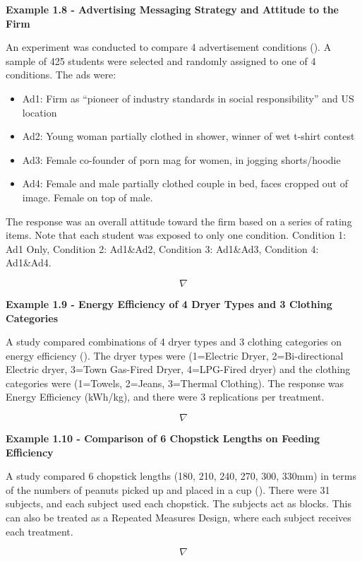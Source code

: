 \documentclass[
]{book}
\providecommand{\tightlist}{%
  \setlength{\itemsep}{0pt}\setlength{\parskip}{0pt}}
\begin{document}
\textbf{Example 1.8 - Advertising Messaging Strategy and Attitude to the
Firm}

An experiment was conducted to compare 4 advertisement conditions
(). A sample
of 425 students were selected and randomly assigned to one of 4
conditions. The ads were:

\begin{itemize}
\tightlist
\item
  Ad1: Firm as ``pioneer of industry standards in social
  responsibility'' and US location
\item
  Ad2: Young woman partially clothed in shower, winner of wet t-shirt
  contest
\item
  Ad3: Female co-founder of porn mag for women, in jogging shorts/hoodie
\item
  Ad4: Female and male partially clothed couple in bed, faces cropped
  out of image. Female on top of male.
\end{itemize}

The response was an overall attitude toward the firm based on a series
of rating items. Note that each student was exposed to only one
condition. Condition 1: Ad1 Only, Condition 2: Ad1\&Ad2, Condition 3:
Ad1\&Ad3, Condition 4: Ad1\&Ad4.

\[\nabla\]

\textbf{Example 1.9 - Energy Efficiency of 4 Dryer Types and 3 Clothing
Categories}

A study compared combinations of 4 dryer types and 3 clothing categories
on energy efficiency (). The dryer
types were (1=Electric Dryer, 2=Bi-directional Electric dryer, 3=Town
Gas-Fired Dryer, 4=LPG-Fired dryer) and the clothing categories were
(1=Towels, 2=Jeans, 3=Thermal Clothing). The response was Energy
Efficiency (kWh/kg), and there were 3 replications per treatment.

\[\nabla\]

\textbf{Example 1.10 - Comparison of 6 Chopstick Lengths on Feeding
Efficiency}

A study compared 6 chopstick lengths (180, 210, 240, 270, 300, 330mm) in
terms of the numbers of peanuts picked up and placed in a cup
(). There were 31 subjects, and
each subject used each chopstick. The subjects act as blocks. This can
also be treated as a Repeated Measures Design, where each subject
receives each treatment.

\[\nabla\]
\end{document}
